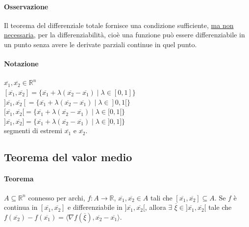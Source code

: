 \documentclass{article}
\newcommand{\R}{\mathbb{R}}
\begin{document}
\paragraph{{Osservazione}}
Il teorema del differenziale totale fornisce una condizione sufficiente, \underline{ma non necessaria}, per la differenziabilità, cioè una funzione può essere differenziabile in un punto senza avere le derivate parziali continue in quel punto.

\paragraph{{Notazione}}
$\overline{x_1},\overline{x_2}\in\R^n$\\
$[\overline{x_1},\overline{x_2}]=\{\overline{x_1}+\lambda(\overline{x_2}-\overline{x_1})\mid\lambda\in[0,1]\}$\\
$]\overline{x_1},\overline{x_2}[=\{\overline{x_1}+\lambda(\overline{x_2}-\overline{x_1})\mid\lambda\in]0,1[\}$\\
$[\overline{x_1},\overline{x_2}[=\{\overline{x_1}+\lambda(\overline{x_2}-\overline{x_1})\mid\lambda\in[0,1[\}$\\
$]\overline{x_1},\overline{x_2}]=\{\overline{x_1}+\lambda(\overline{x_2}-\overline{x_1})\mid\lambda\in]0,1]\}$\\
segmenti di estremi $\overline{x_1}$ e $\overline{x_2}$.

\subsection{{Teorema del valor medio}}
\paragraph{{Teorema}}
$A \subseteq \R^n$ connesso per archi, $f:A\rightarrow \R$, $\overline{x_1},\overline{x_2}\in A$ tali che $[\overline{x_1},\overline{x_2}]\subseteq A$. Se $f$ è continua in $[\overline{x_1},\overline{x_2}]$ e differenziabile in $]\overline{x_1},\overline{x_2}[$, allora $\exists\,\, \overline{\xi} \in]\overline{x_1},\overline{x_2}[$ tale che $f(\overline{x_2})-f(\overline{x_1})=\langle \nabla f(\overline{\xi}),\overline{x_2}-\overline{x_1} \rangle$.
\end{document}
